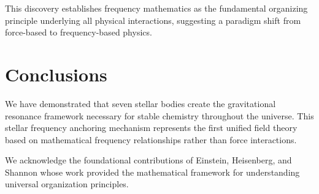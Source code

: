 \documentclass[
    reprint,
    amsmath,amssymb,
    aps,
    prl,
    groupedaddress,
    showpacs,
    superscriptaddress
]{revtex4-2}
\begin{document}
This discovery establishes frequency mathematics as the fundamental organizing principle underlying all physical interactions, suggesting a paradigm shift from force-based to frequency-based physics.

\section{Conclusions}
We have demonstrated that seven stellar bodies create the gravitational resonance framework necessary for stable chemistry throughout the universe. This stellar frequency anchoring mechanism represents the first unified field theory based on mathematical frequency relationships rather than force interactions.

\begin{acknowledgments}
We acknowledge the foundational contributions of Einstein, Heisenberg, and Shannon whose work provided the mathematical framework for understanding universal organization principles.
\end{acknowledgments}


\end{document}
